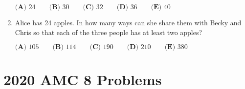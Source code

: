 \documentclass{article}
\begin{document}
\begin{enumerate}[label=\arabic*., itemsep=0.5em]
\(\textbf{(A) }24\qquad\textbf{(B) }30\qquad\textbf{(C) }32\qquad\textbf{(D) }36\qquad\textbf{(E) }40\)\par \vspace{0.5em}\item Alice has 24 apples. In how many ways can she share them with Becky and
Chris so that each of the three people has at least two apples?

\(\textbf{(A) }105\qquad\textbf{(B) }114\qquad\textbf{(C) }190\qquad\textbf{(D) }210\qquad\textbf{(E) }380\)\par \vspace{0.5em}\end{enumerate}\newpage\section*{2020 AMC 8 Problems}
\end{document}
